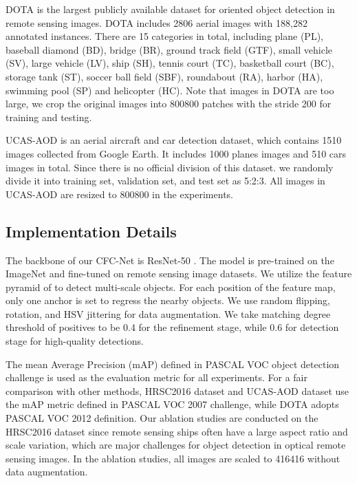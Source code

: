 \documentclass[journal]{IEEEtran}
\begin{document}
DOTA \cite{xia2018dota}  is the largest publicly available dataset for oriented object detection in remote sensing images. DOTA includes 2806 aerial images with 188,282 annotated instances. There are 15 categories in total, including  plane (PL), baseball diamond (BD), bridge (BR), ground track field (GTF), small vehicle (SV), large vehicle (LV), ship (SH), tennis court (TC), basketball court (BC), storage tank (ST), soccer ball field (SBF), roundabout (RA), harbor (HA), swimming pool (SP) and helicopter (HC). Note that images in DOTA are too large, we crop the original images into 800800 patches with the stride 200 for training and testing. 

UCAS-AOD \cite{zhu2015orientation} is an aerial aircraft and car detection dataset, which contains 1510 images collected from Google Earth. It includes 1000 planes images and 510 cars images in total. Since there is no official division of this dataset. we randomly divide it into training set, validation set, and test set as 5:2:3. All images in UCAS-AOD are resized to 800800 in the experiments.         




\subsection{Implementation Details}
The backbone of our CFC-Net is ResNet-50 \cite{he2016deep}. The model is pre-trained on the ImageNet and fine-tuned on remote sensing image datasets. We utilize the feature pyramid of  to detect multi-scale objects. For each position of the feature map, only one anchor is set to regress the nearby objects. We use random flipping, rotation, and HSV jittering for data augmentation. We take matching degree threshold of positives to be 0.4 for the refinement stage, while 0.6 for detection stage for high-quality detections. 

The mean Average Precision (mAP) defined in PASCAL VOC object detection challenge \cite{everingham2010pascal} is used as the evaluation metric for all experiments. For a fair comparison with other methods, HRSC2016 dataset and UCAS-AOD dataset use the mAP metric defined in PASCAL VOC 2007 challenge, while DOTA adopts PASCAL VOC 2012 definition. Our ablation studies are conducted on the HRSC2016 dataset since remote sensing ships often have a large aspect ratio and scale variation, which are major challenges for object detection in optical remote sensing images. In the ablation studies, all images are scaled to 416416 without data augmentation.
\end{document}
